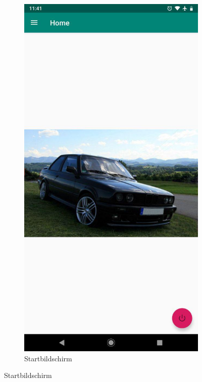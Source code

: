 \begin{figure}[H]
    \centering
    \begin{subfigure}[b]{0.3\linewidth}
      \includegraphics[width=1\linewidth]{figures/home.jpg}
      \caption{Startbildschirm}
    \end{subfigure}

\end{figure}
